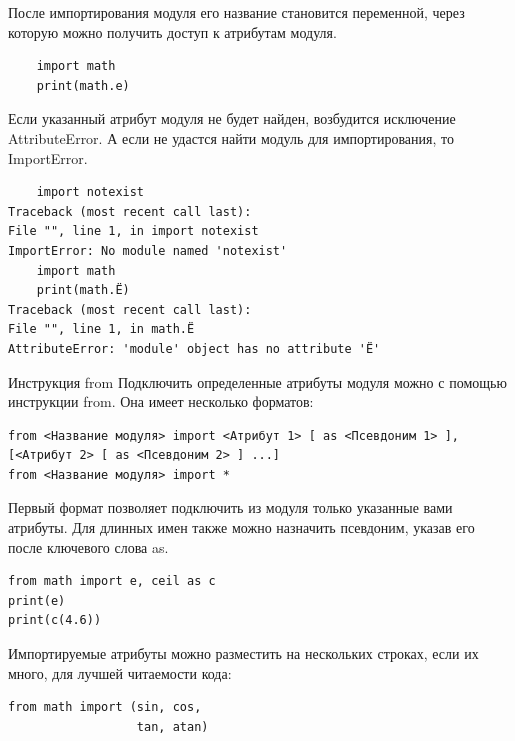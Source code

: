 \documentclass[xcolor=table]{beamer}
\begin{document}
\begin{frame}[fragile]
	После импортирования модуля его название становится переменной, через которую
можно получить доступ к атрибутам модуля. 	
	\begin{verbatim}
	import math
	print(math.e)
	\end{verbatim}
	
	Если указанный атрибут модуля не будет найден, возбудится исключение AttributeError. А если не удастся найти модуль для импортирования, то ImportError. 
	\begin{verbatim}
	import notexist
Traceback (most recent call last):
File "", line 1, in import notexist
ImportError: No module named 'notexist'
	import math
	print(math.Ё)
Traceback (most recent call last):
File "", line 1, in math.Ё
AttributeError: 'module' object has no attribute 'Ё'
	\end{verbatim}
\end{frame}

\begin{frame}[fragile]{Инструкция from}
	Подключить определенные атрибуты модуля можно с помощью инструкции from. Она
имеет несколько форматов: 	
	\begin{verbatim}
from <Название модуля> import <Атрибут 1> [ as <Псевдоним 1> ], [<Атрибут 2> [ as <Псевдоним 2> ] ...]
from <Название модуля> import *
	\end{verbatim}
	
	Первый формат позволяет подключить из модуля только указанные вами атрибуты. Для длинных имен также можно назначить псевдоним, указав его после ключевого слова as.
	\begin{verbatim}
from math import e, ceil as c
print(e)
print(c(4.6))
	\end{verbatim}
	
	Импортируемые атрибуты можно разместить на нескольких строках, если их много, для лучшей читаемости кода:	
	\begin{verbatim}
from math import (sin, cos,
                  tan, atan)
	\end{verbatim}
\end{frame}
\end{document}
